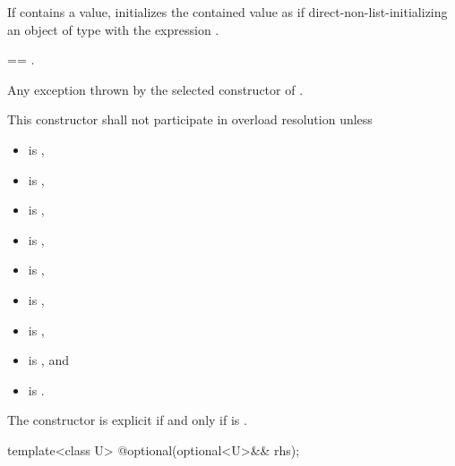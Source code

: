 \begin{itemdescr}
\pnum
\effects
If  contains a value,
initializes the contained value as if direct-non-list-initializing
an object of type  with the expression .

\pnum
\postconditions
{} == .

\pnum
\throws
Any exception thrown by the selected constructor of .

\pnum
\remarks
This constructor shall not participate in overload resolution unless
\begin{itemize}
\item {} is ,
\item {} is ,
\item {} is ,
\item {} is ,
\item {} is ,
\item {} is ,
\item {} is ,
\item {} is , and
\item {} is .
\end{itemize}
The constructor is explicit if and only if
 is .
\end{itemdescr}

%
\begin{itemdecl}
template<class U> @\EXPLICIT@ optional(optional<U>&& rhs);
\end{itemdecl}

